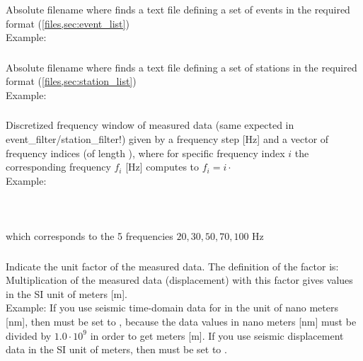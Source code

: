 \subsubsection{} \label{files,sec:main_parfile,itm:file_event_list}
Absolute filename where \ASKI{} finds a text file defining a set of events in the required format 
(\ref{files,sec:event_list})\\
Example: 
\subsubsection{} \label{files,sec:main_parfile,itm:file_station_list}
Absolute filename where \ASKI{} finds a text file defining a set of stations in the required format 
(\ref{files,sec:station_list})\\
Example: 
\subsubsection{} 
\label{files,sec:main_parfile,itm:mdata_freq}
Discretized frequency window of measured data (same expected in event\_filter/station\_filter!) given by a frequency 
step  [Hz] and a vector of frequency indices 
(of length ), where for specific frequency index $i$ the corresponding frequency $f_i$ [Hz] 
computes to $f_i = i \cdot$ \\
Example:\\
\\
\\
\\
which corresponds to the 5 frequencies $20,30,50,70,100$ Hz
\subsubsection{} 
Indicate the unit factor of the measured data. The definition of the factor is:\\
Multiplication of the measured data (displacement) with this factor gives values in the SI unit of meters [m].\\
Example: If you use seismic time-domain data for \ASKI{} in the unit of nano meters [nm], then 
must be set to  , because the data values in nano meters [nm] must be divided by $1.0\cdot 10^9$ in order to get meters [m].
If you use seismic displacement data in the SI unit of meters, then  must be set to .
